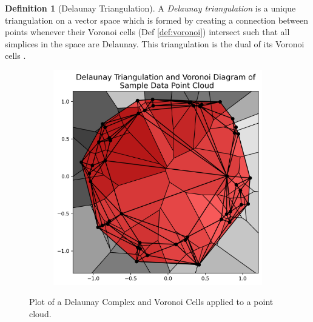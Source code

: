 \documentclass[ma]{uncgdissertationexp}
\theoremstyle{plain}
\theoremstyle{definition}
\newtheorem{definition}[theorem]{Definition}
\theoremstyle{remark}
\begin{document}
\begin{definition}[Delaunay Triangulation] A \textit{Delaunay triangulation} is a unique triangulation on a vector space which is formed by creating a connection between points whenever their Voronoi cells (Def \ref{def:voronoi}) intersect such that all simplices in the space are Delaunay. This triangulation is the dual of its Voronoi cells \cite{deltri}\cite{tetgen}.
\end{definition}
\begin{figure}[H]
    \centering
    \begin{subfigure}[b]{0.35\textwidth}
        \centering
        \includegraphics[width=\textwidth]{point_cloud_plot_del.png}
    \end{subfigure}
    \caption{Plot of a Delaunay Complex and Voronoi Cells applied to a point cloud.}
    \label{fig:point_cloud_del_voronoi}
\end{figure}
\end{document}
